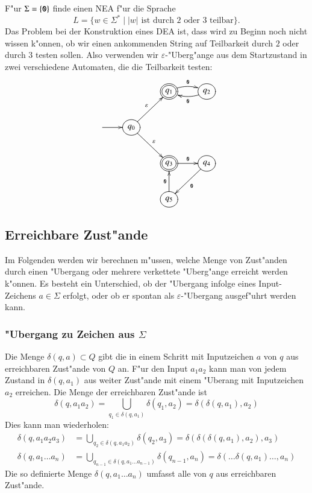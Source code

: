 \begin{beispiel}[\bf Teilbarkeit]
F"ur $\Sigma=\{{\tt 0}\}$ finde einen NEA f"ur die Sprache 
\[
L=\{w\in \Sigma^*\;|\; \text{$|w|$ ist durch 2 oder 3 teilbar}\}.
\]
Das Problem bei der Konstruktion eines DEA ist, dass wird zu
Beginn noch nicht wissen k"onnen, ob wir einen ankommenden
String auf Teilbarkeit durch $2$ oder durch $3$ testen sollen.
Also verwenden wir $\varepsilon$-"Uberg"ange aus dem Startzustand
in zwei verschiedene Automaten, die die Teilbarkeit testen:
\[
\entrymodifiers={++[o][F]}
\xymatrix{
*+\txt{}
	&*+\txt{}
		&*++[o][F=]{q_1} \ar@/^/[r]^{\tt 0}
			&{q_2} \ar@/^/[l]^{\tt 0}
\\
*+\txt{} \ar[r]
	&{q_0}\ar[ur]^{\varepsilon} \ar[dr]^{\varepsilon}
\\
*+\txt{}
	&*+\txt{}
		&*++[o][F=]{q_3}\ar[r]^{\tt 0}
			&{q_4}\ar[dl]^{\tt 0}
\\
*+\txt{}
	&*+\txt{}
		&{q_5}\ar[u]^{\tt 0}
}
\]
\end{beispiel}

\subsection{Erreichbare Zust"ande\label{regulaer:erreichbarezustaende}}
Im Folgenden werden wir berechnen m"ussen, welche Menge von Zust"anden
durch einen "Ubergang oder mehrere verkettete "Uberg"ange erreicht werden
k"onnen.  Es besteht ein Unterschied, ob der "Ubergang infolge eines
Input-Zeichens $a\in\Sigma$ erfolgt, oder ob er spontan als
$\varepsilon$-"Ubergang ausgef"uhrt werden kann.

\subsubsection{"Ubergang zu Zeichen aus $\Sigma$}
Die Menge $\delta(q,a)\subset Q$ gibt die in einem Schritt mit Inputzeichen $a$
von $q$ aus erreichbaren Zust"ande von $Q$ an. F"ur den Input $a_1a_2$ kann
man von jedem Zustand in $\delta(q,a_1)$ aus weiter Zust"ande mit einem
"Uberang mit Inputzeichen $a_2$ erreichen. Die Menge der erreichbaren
Zust"ande ist
\begin{equation}
\delta(q,a_1a_2)=\bigcup_{q_1\in\delta(q,a_1)}\delta(q_1, a_2)
=\delta(\delta(q,a_1),a_2)
\label{erreichbar}
\end{equation}
Dies kann man wiederholen:
\begin{align*}
\delta(q,a_1a_2a_3)&=
\bigcup_{q_2\in\delta(q, a_1a_2)}\delta(q_2,a_3)
=
\delta(\delta(\delta(q,a_1),a_2),a_3)
\\
\delta(q,a_1\dots a_n)&=\bigcup_{q_{n-1}\in\delta(q,a_1\dots a_{n-1})}\delta(q_{n-1},a_n)
=\delta(\dots \delta(q,a_1)\dots,a_n)
\end{align*}
Die so definierte Menge $\delta(q,a_1\dots a_n)$ umfasst alle von
$q$ aus erreichbaren Zust"ande.

